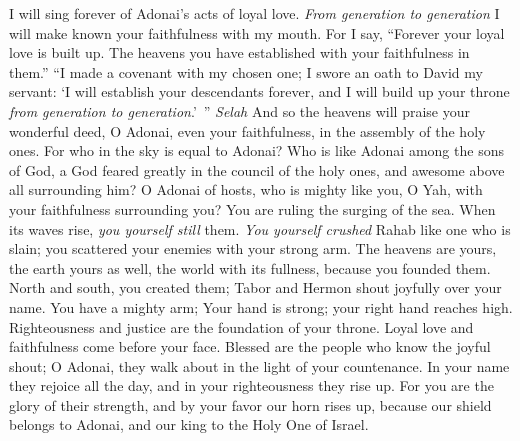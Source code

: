\begin{biblechapter} %
 I will sing forever of Adonai’s acts of loyal love. 
\textit{From generation to generation} 
I will make known your faithfulness with my mouth.
\verse For I say, “Forever your loyal love is built up. 
The heavens you have established with your faithfulness in them.”
\verse “I made a covenant with my chosen one; 
I swore an oath to David my servant:
\verse ‘I will establish your descendants forever, 
and I will build up your throne \textit{from generation to generation}.’ ” \textit{Selah}
\verse And so the heavens will praise your wonderful deed, O Adonai, 
even your faithfulness, in the assembly of the holy ones.
\verse For who in the sky is equal to Adonai? 
Who is like Adonai among the sons of God,
\verse a God feared greatly in the council of the holy ones, 
and awesome above all surrounding him?
\verse O Adonai of hosts, 
who is mighty like you, O Yah, 
with your faithfulness surrounding you?
\verse You are ruling the surging of the sea. 
When its waves rise, \textit{you yourself still} them.
\verse \textit{You yourself crushed} Rahab like one who is slain; 
you scattered your enemies with your strong arm.
\verse The heavens are yours, the earth yours as well, 
the world with its fullness, because you founded them.
\verse North and south, you created them; 
Tabor and Hermon shout joyfully over your name.
\verse You have a mighty arm; 
Your hand is strong; your right hand reaches high.
\verse Righteousness and justice are the foundation of your throne. 
Loyal love and faithfulness come before your face.
\verse Blessed are the people who know the joyful shout; 
O Adonai, they walk about in the light of your countenance.
\verse In your name they rejoice all the day, 
and in your righteousness they rise up.
\verse For you are the glory of their strength, 
and by your favor our horn rises up,
\verse because our shield belongs to Adonai, 
and our king to the Holy One of Israel.

\end{biblechapter}
